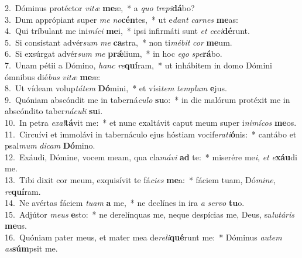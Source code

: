 {2.~}Dóminus protéctor \textit{vi}\textit{tæ} \textbf{me}æ,~* a \textit{quo} \textit{tre}\textit{pi}\textbf{dá}bo?\\
{3.~}Dum apprópiant super \textit{me} \textit{no}\textbf{cén}tes,~* ut e\textit{dant} \textit{car}\textit{nes} \textbf{me}as:\\
{4.~}Qui tríbulant me ini\textit{mí}\textit{ci} \textbf{me}i,~* ipsi infirmáti sunt \textit{et} \textit{ce}\textit{ci}\textbf{dé}runt.\\
{5.~}Si consístant advér\textit{sum} \textit{me} \textbf{ca}stra,~* non ti\textit{mé}\textit{bit} \textit{cor} \textbf{me}um.\\
{6.~}Si exsúrgat advér\textit{sum} \textit{me} \textbf{prǽ}lium,~* in hoc \textit{e}\textit{go} \textit{spe}\textbf{rá}bo.\\
{7.~}Unam pétii a Dómino, \textit{hanc} \textit{re}\textbf{quí}ram,~* ut inhábitem in domo Dómini ómnibus dié\textit{bus} \textit{vi}\textit{tæ} \textbf{me}æ:\\
{8.~}Ut vídeam volup\textit{tá}\textit{tem} \textbf{Dó}mini,~* et vísi\textit{tem} \textit{tem}\textit{plum} \textbf{e}jus.\\
{9.~}Quóniam abscóndit me in taberná\textit{cu}\textit{lo} \textbf{su}o:~* in die malórum protéxit me in abscóndito taber\textit{ná}\textit{cu}\textit{li} \textbf{su}i.\\
{10.~}In petra \textit{e}\textit{xal}\textbf{tá}vit me:~* et nunc exaltávit caput meum super i\textit{ni}\textit{mí}\textit{cos} \textbf{me}os.\\
{11.~}Circuívi et immolávi in tabernáculo ejus hóstiam vocife\textit{ra}\textit{ti}\textbf{ó}nis:~* cantábo et psal\textit{mum} \textit{di}\textit{cam} \textbf{Dó}mino.\\
{12.~}Exáudi, Dómine, vocem meam, qua cla\textit{má}\textit{vi} \textbf{ad} te:~* miserére me\textit{i}, \textit{et} \textit{e}\textbf{xáu}di me.\\
{13.~}Tibi dixit cor meum, exquisívit te fá\textit{ci}\textit{es} \textbf{me}a:~* fáciem tuam, Dó\textit{mi}\textit{ne}, \textit{re}\textbf{quí}ram.\\
{14.~}Ne avértas fáciem \textit{tu}\textit{am} \textbf{a} me,~* ne declínes in ira \textit{a} \textit{ser}\textit{vo} \textbf{tu}o.\\
{15.~}Adjútor \textit{me}\textit{us} \textbf{e}sto:~* ne derelínquas me, neque despícias me, Deus, sa\textit{lu}\textit{tá}\textit{ris} \textbf{me}us.\\
{16.~}Quóniam pater meus, et mater mea de\textit{re}\textit{li}\textbf{qué}runt me:~* Dóminus \textit{au}\textit{tem} \textit{as}\textbf{súm}psit me.\\

